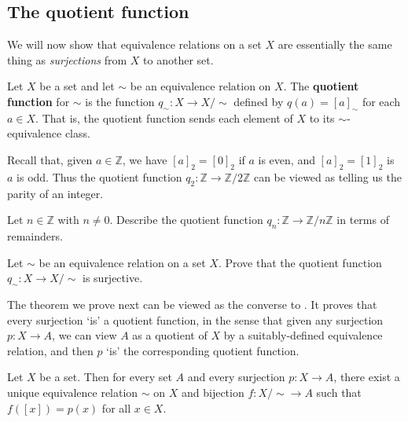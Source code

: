 \subsection*{The quotient function}

We will now show that equivalence relations on a set $X$ are essentially the same thing as \textit{surjections} from $X$ to another set.

\begin{definition}
\label{defQuotientFunction}
Let $X$ be a set and let $\sim$ be an equivalence relation on $X$. The \textbf{quotient function} for $\sim$ is the function $q_{\sim} : X \to X/{\sim}$ defined by $q(a) = [a]_{\sim}$ for each $a \in X$. That is, the quotient function sends each element of $X$ to its $\sim$-equivalence class.
\end{definition}

\begin{example}
Recall that, given $a \in \mathbb{Z}$, we have $[a]_2 = [0]_2$ if $a$ is even, and $[a]_2 = [1]_2$ is $a$ is odd. Thus the quotient function $q_2 : \mathbb{Z} \to \mathbb{Z}/2\mathbb{Z}$ can be viewed as telling us the parity of an integer.
\end{example}

\begin{exercise}
Let $n \in \mathbb{Z}$ with $n \ne 0$. Describe the quotient function $q_n : \mathbb{Z} \to \mathbb{Z}/n\mathbb{Z}$ in terms of remainders.
\end{exercise}

\begin{exercise}
\label{exQuotientFunctionIsSurjective}
Let $\sim$ be an equivalence relation on a set $X$. Prove that the quotient function $q_{\sim} : X \to X/{\sim}$ is surjective.
\end{exercise}

The theorem we prove next can be viewed as the converse to . It proves that every surjection `is' a quotient function, in the sense that given any surjection $p : X \to A$, we can view $A$ as a quotient of $X$ by a suitably-defined equivalence relation, and then $p$ `is' the corresponding quotient function.

\begin{theorem}
\label{thmEquivalenceRelationsSurjections}
Let $X$ be a set. Then for every set $A$ and every surjection $p : X \to A$, there exist a unique equivalence relation $\sim$ on $X$ and bijection $f : X/{\sim} \to A$ such that $f([x]) = p(x)$ for all $x \in X$.
\end{theorem}

